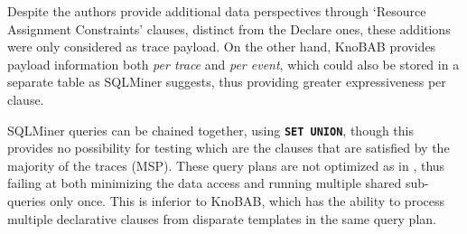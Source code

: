 {Despite the authors } provide additional {data} perspectives through `Resource Assignment Constraints' clauses, distinct from the Declare ones, these additions were only considered  {as trace payload}. On the other hand, KnoBAB provides payload information {both \emph{per trace}} and \emph{per event}, which could also be stored in a separate table as SQLMiner suggests, thus providing greater expressiveness per clause.

SQLMiner queries can be chained together, using \texttt{\textbf{SET UNION}}, though this provides no possibility for testing which are the clauses that are satisfied by the majority of the traces (MSP). These query plans are not optimized as in \cite{BellatrecheKB21}, thus failing at both minimizing the data access
and running multiple shared sub-queries only once.
This is inferior to KnoBAB, which has the ability to process multiple 
declarative clauses from disparate templates in the same query plan.
